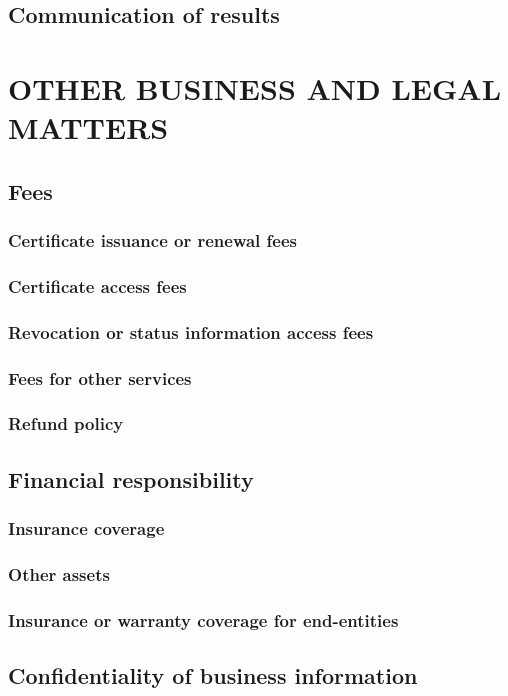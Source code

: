 \documentclass[10pt]{article}
\begin{document}
\subsection{Communication of results}
\section{OTHER BUSINESS AND LEGAL MATTERS}
\subsection{Fees}
\subsubsection{Certificate issuance or renewal fees}
\subsubsection{Certificate access fees}
\subsubsection{Revocation or status information access fees}
\subsubsection{Fees for other services}
\subsubsection{Refund policy}
\subsection{Financial responsibility}
\subsubsection{Insurance coverage}
\subsubsection{Other assets}
\subsubsection{Insurance or warranty coverage for end-entities}
\subsection{Confidentiality of business information}
\end{document}
